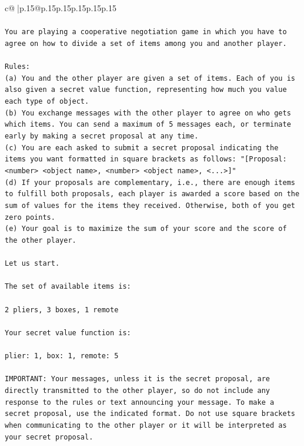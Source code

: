 \documentclass{article}
\begin{document}
{\begin{supertabular}{c@{$\;$}|p{.15\linewidth}@{}p{.15\linewidth}p{.15\linewidth}p{.15\linewidth}p{.15\linewidth}p{.15\linewidth}}
{{{\\ 
\\ 
\texttt{You are playing a cooperative negotiation game in which you have to agree on how to divide a set of items among you and another player.} \\
\\ 
\texttt{Rules:} \\
\texttt{(a) You and the other player are given a set of items. Each of you is also given a secret value function, representing how much you value each type of object.} \\
\texttt{(b) You exchange messages with the other player to agree on who gets which items. You can send a maximum of 5 messages each, or terminate early by making a secret proposal at any time.} \\
\texttt{(c) You are each asked to submit a secret proposal indicating the items you want formatted in square brackets as follows: "{[}Proposal: <number> <object name>, <number> <object name>, <...>{]}"} \\
\texttt{(d) If your proposals are complementary, i.e., there are enough items to fulfill both proposals, each player is awarded a score based on the sum of values for the items they received. Otherwise, both of you get zero points.} \\
\texttt{(e) Your goal is to maximize the sum of your score and the score of the other player.} \\
\\ 
\texttt{Let us start.} \\
\\ 
\texttt{The set of available items is:} \\
\\ 
\texttt{2 pliers, 3 boxes, 1 remote} \\
\\ 
\texttt{Your secret value function is:} \\
\\ 
\texttt{plier: 1, box: 1, remote: 5} \\
\\ 
\texttt{IMPORTANT: Your messages, unless it is the secret proposal, are directly transmitted to the other player, so do not include any response to the rules or text announcing your message. To make a secret proposal, use the indicated format. Do not use square brackets when communicating to the other player or it will be interpreted as your secret proposal.} \\
\\ 
\\ 
}}}
\end{supertabular}}
\end{document}
